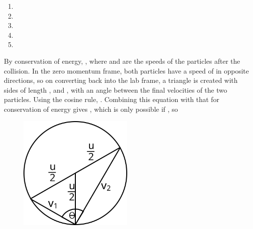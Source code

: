 
\begin{problem} 
{ 
\begin{enumerate}
	\item {}
	\item {}
	\item {}
	\item {}\correct
	\item {}
\end{enumerate}
}
{}
{ By conservation of energy, , where  and  are the speeds of the particles after the collision. In the zero momentum frame, both particles have a speed of  in opposite directions, so on converting back into the lab frame, a triangle is created with sides of length ,  and  , with an angle \vari{\theta} between the final velocities of the two particles. Using the cosine rule, . Combining this equation with that for conservation of energy gives , which is only possible if , so 

\begin{figure}[h]
	\centering
	\includegraphics[width=0.5\textwidth]{../../../figures/dynamics_angle_between_identical_masses.svg}
	\caption{}\label{fig:Dynamics_angle_between_identical_masses}
\end{figure}
}
\end{problem}
